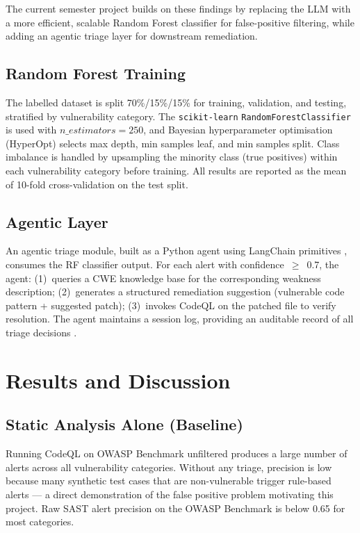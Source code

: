 \documentclass[conference]{IEEEtran}
\begin{document}
The current semester project builds on these findings by replacing the LLM with a
more efficient, scalable Random Forest classifier for false-positive filtering,
while adding an agentic triage layer for downstream remediation.

\subsection{Random Forest Training}

The labelled dataset is split 70\%/15\%/15\% for training, validation, and testing,
stratified by vulnerability category. The \texttt{scikit-learn} \texttt{RandomForestClassifier} is used with $n\_estimators=250$,
and Bayesian hyperparameter optimisation (HyperOpt) selects max depth, min samples
leaf, and min samples split. Class imbalance is handled by upsampling the minority
class (true positives) within each vulnerability category before training. All
results are reported as the mean of 10-fold cross-validation on the test split.

\subsection{Agentic Layer}

An agentic triage module, built as a Python agent using LangChain primitives
\cite{syed2025agentic}, consumes the RF classifier output. For each alert with
confidence~$\geq$~0.7, the agent: (1)~queries a CWE knowledge base for the
corresponding weakness description; (2)~generates a structured remediation
suggestion (vulnerable code pattern + suggested patch); (3)~invokes CodeQL on the
patched file to verify resolution. The agent maintains a session log, providing
an auditable record of all triage decisions \cite{bakane2025thesis}.

\section{Results and Discussion}
\label{sec:results}

\subsection{Static Analysis Alone (Baseline)}

Running CodeQL on OWASP Benchmark unfiltered produces a large number of alerts
across all vulnerability categories. Without any triage, precision is low because
many synthetic test cases that are non-vulnerable trigger rule-based alerts --- a
direct demonstration of the false positive problem motivating this project. Raw
SAST alert precision on the OWASP Benchmark is below 0.65 for most categories.
\end{document}
